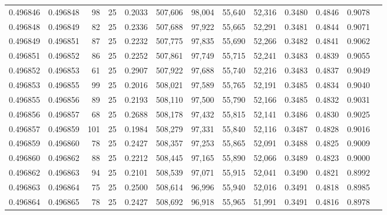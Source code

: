 \begin{tabular}{rrrrrrrrrrrrr}
0.496846 & 0.496848 &    98 &  25 &                                     0.2033 & 507,606 &  98,004 &  55,640 &  52,316 & 0.3480 & 0.4846 & 0.9078 \\
0.496848 & 0.496849 &    82 &  25 &                                     0.2336 & 507,688 &  97,922 &  55,665 &  52,291 & 0.3481 & 0.4844 & 0.9071 \\
0.496849 & 0.496851 &    87 &  25 &                                     0.2232 & 507,775 &  97,835 &  55,690 &  52,266 & 0.3482 & 0.4841 & 0.9062 \\
0.496851 & 0.496852 &    86 &  25 &                                     0.2252 & 507,861 &  97,749 &  55,715 &  52,241 & 0.3483 & 0.4839 & 0.9055 \\
0.496852 & 0.496853 &    61 &  25 &                                     0.2907 & 507,922 &  97,688 &  55,740 &  52,216 & 0.3483 & 0.4837 & 0.9049 \\
0.496853 & 0.496855 &    99 &  25 &                                     0.2016 & 508,021 &  97,589 &  55,765 &  52,191 & 0.3485 & 0.4834 & 0.9040 \\
0.496855 & 0.496856 &    89 &  25 &                                     0.2193 & 508,110 &  97,500 &  55,790 &  52,166 & 0.3485 & 0.4832 & 0.9031 \\
0.496856 & 0.496857 &    68 &  25 &                                     0.2688 & 508,178 &  97,432 &  55,815 &  52,141 & 0.3486 & 0.4830 & 0.9025 \\
0.496857 & 0.496859 &   101 &  25 &                                     0.1984 & 508,279 &  97,331 &  55,840 &  52,116 & 0.3487 & 0.4828 & 0.9016 \\
0.496859 & 0.496860 &    78 &  25 &                                     0.2427 & 508,357 &  97,253 &  55,865 &  52,091 & 0.3488 & 0.4825 & 0.9009 \\
0.496860 & 0.496862 &    88 &  25 &                                     0.2212 & 508,445 &  97,165 &  55,890 &  52,066 & 0.3489 & 0.4823 & 0.9000 \\
0.496862 & 0.496863 &    94 &  25 &                                     0.2101 & 508,539 &  97,071 &  55,915 &  52,041 & 0.3490 & 0.4821 & 0.8992 \\
0.496863 & 0.496864 &    75 &  25 &                                     0.2500 & 508,614 &  96,996 &  55,940 &  52,016 & 0.3491 & 0.4818 & 0.8985 \\
0.496864 & 0.496865 &    78 &  25 &                                     0.2427 & 508,692 &  96,918 &  55,965 &  51,991 & 0.3491 & 0.4816 & 0.8978 \\

\end{tabular}
